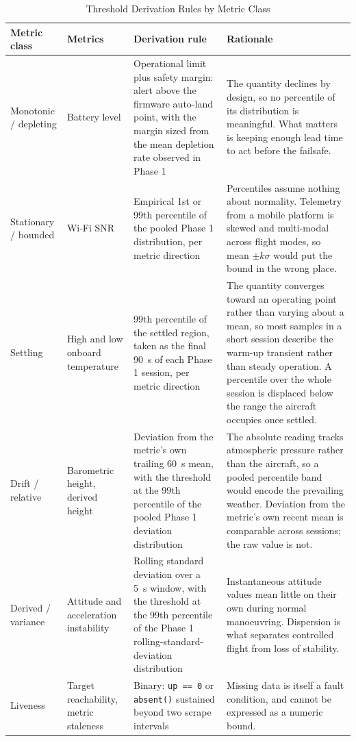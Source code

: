\begin{table}[htbp]
\centering
\caption{Threshold Derivation Rules by Metric Class}
\label{tab:threshold-rules}
\footnotesize
\begin{tabular}{|p{2.4cm}|p{3.1cm}|p{4.2cm}|p{4.1cm}|}
\hline
\textbf{Metric class} & \textbf{Metrics} & \textbf{Derivation rule} & \textbf{Rationale} \\
\hline
Monotonic / depleting & Battery level & Operational limit plus safety margin: alert above the firmware auto-land point, with the margin sized from the mean depletion rate observed in Phase 1 & The quantity declines by design, so no percentile of its distribution is meaningful. What matters is keeping enough lead time to act before the failsafe. \\
\hline
Stationary / bounded & Wi-Fi SNR & Empirical 1st or 99th percentile of the pooled Phase 1 distribution, per metric direction & Percentiles assume nothing about normality. Telemetry from a mobile platform is skewed and multi-modal across flight modes, so mean $\pm k\sigma$ would put the bound in the wrong place. \\
\hline
Settling & High and low onboard temperature & 99th percentile of the settled region, taken as the final \SI{90}{\second} of each Phase 1 session, per metric direction & The quantity converges toward an operating point rather than varying about a mean, so most samples in a short session describe the warm-up transient rather than steady operation. A percentile over the whole session is displaced below the range the aircraft occupies once settled. \\
\hline
Drift / relative & Barometric height, derived height & Deviation from the metric's own trailing \SI{60}{\second} mean, with the threshold at the 99th percentile of the pooled Phase 1 deviation distribution & The absolute reading tracks atmospheric pressure rather than the aircraft, so a pooled percentile band would encode the prevailing weather. Deviation from the metric's own recent mean is comparable across sessions; the raw value is not. \\
\hline
Derived / variance & Attitude and acceleration instability & Rolling standard deviation over a \SI{5}{\second} window, with the threshold at the 99th percentile of the Phase 1 rolling-standard-deviation distribution & Instantaneous attitude values mean little on their own during normal manoeuvring. Dispersion is what separates controlled flight from loss of stability. \\
\hline
Liveness & Target reachability, metric staleness & Binary: \texttt{up == 0} or \texttt{absent()} sustained beyond two scrape intervals & Missing data is itself a fault condition, and cannot be expressed as a numeric bound. \\
\hline
\end{tabular}
\end{table}

